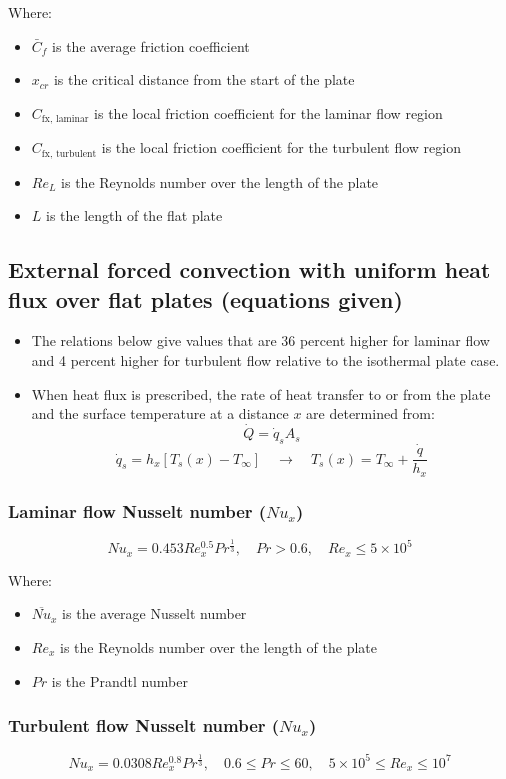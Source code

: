 \documentclass[11pt]{article}
\begin{document}
Where:
\begin{itemize}
\item \(\bar{C}_f\) is the average friction coefficient
\item \(x_{cr}\) is the critical distance from the start of the plate
\item \(C_{\text{fx, laminar}}\) is the local friction coefficient for the laminar flow region
\item \(C_{\text{fx, turbulent}}\) is the local friction coefficient for the turbulent flow region
\item \(Re_L\) is the Reynolds number over the length of the plate
\item \(L\) is the length of the flat plate
\end{itemize}
\subsection{External forced convection with uniform heat flux over flat plates (equations given)}
\label{sec:org4477439}
\begin{itemize}
\item The relations below give values that are 36 percent higher for laminar flow and 4 percent higher for turbulent flow relative to the isothermal plate case.
\item When heat flux is prescribed, the rate of heat transfer to or from the plate and the surface temperature at a distance \(x\) are determined from:
\[\dot{Q} = \dot{q}_s A_s\]
\[\dot{q}_s = h_x [T_s(x) - T_{\infty}] \quad \rightarrow \quad T_s (x) = T_{\infty} + \frac{\dot{q}}{h_x}\]
\end{itemize}
\subsubsection{Laminar flow Nusselt number (\(Nu_x\))}
\label{sec:org5cda6e6}
\[Nu_x = 0.453 Re_x^{0.5} Pr^{\frac{1}{3}}, \quad Pr > 0.6, \quad Re_x \le 5 \times 10^5\]

Where:
\begin{itemize}
\item \(\overline{Nu}_x\) is the average Nusselt number
\item \(Re_x\) is the Reynolds number over the length of the plate
\item \(Pr\) is the Prandtl number
\end{itemize}
\subsubsection{Turbulent flow Nusselt number (\(Nu_x\))}
\label{sec:org9e2336c}
\[Nu_x = 0.0308 Re_x^{0.8} Pr^{\frac{1}{3}}, \quad 0.6 \le Pr \le 60, \quad 5 \times 10^5 \le Re_x \le 10^7\]
\end{document}
